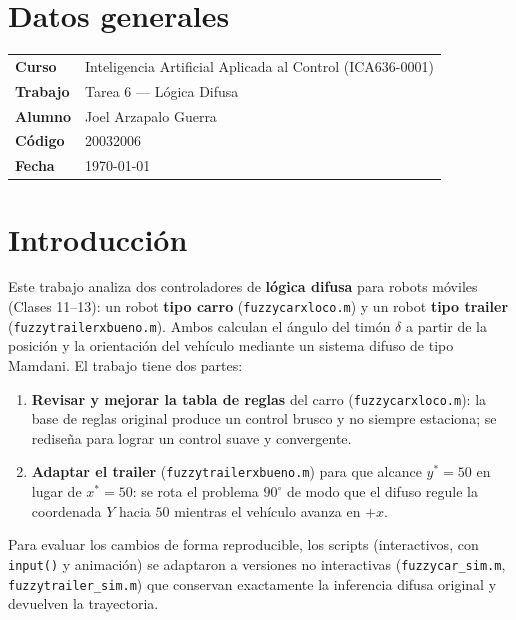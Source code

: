 \documentclass[11pt,a4paper]{article}
\newcommand{\code}[1]{\texttt{\small #1}}
\begin{document}
\section{Datos generales}
\begin{center}
\renewcommand{\arraystretch}{1.3}
\begin{tabular}{ll}
\toprule
\textbf{Curso} & Inteligencia Artificial Aplicada al Control (ICA636-0001) \\
\textbf{Trabajo} & Tarea 6 --- Lógica Difusa \\
\textbf{Alumno} & Joel Arzapalo Guerra \\
\textbf{Código} & 20032006 \\
\textbf{Fecha} & \today \\
\bottomrule
\end{tabular}
\end{center}
\vspace{0.4cm}

\section{Introducción}
Este trabajo analiza dos controladores de \textbf{lógica difusa} para robots móviles
(Clases 11--13): un robot \textbf{tipo carro} (\code{fuzzycarxloco.m}) y un robot
\textbf{tipo trailer} (\code{fuzzytrailerxbueno.m}). Ambos calculan el ángulo del timón
$\delta$ a partir de la posición y la orientación del vehículo mediante un sistema difuso
de tipo Mamdani. El trabajo tiene dos partes:
\begin{enumerate}
  \item \textbf{Revisar y mejorar la tabla de reglas} del carro (\code{fuzzycarxloco.m}):
        la base de reglas original produce un control brusco y no siempre estaciona; se
        rediseña para lograr un control suave y convergente.
  \item \textbf{Adaptar el trailer} (\code{fuzzytrailerxbueno.m}) para que alcance
        $y^*=50$ en lugar de $x^*=50$: se rota el problema $90^\circ$ de modo que el
        difuso regule la coordenada $Y$ hacia $50$ mientras el vehículo avanza en $+x$.
\end{enumerate}
Para evaluar los cambios de forma reproducible, los scripts (interactivos, con
\code{input()} y animación) se adaptaron a versiones no interactivas
(\code{fuzzycar\_sim.m}, \code{fuzzytrailer\_sim.m}) que conservan exactamente la
inferencia difusa original y devuelven la trayectoria.
\end{document}
